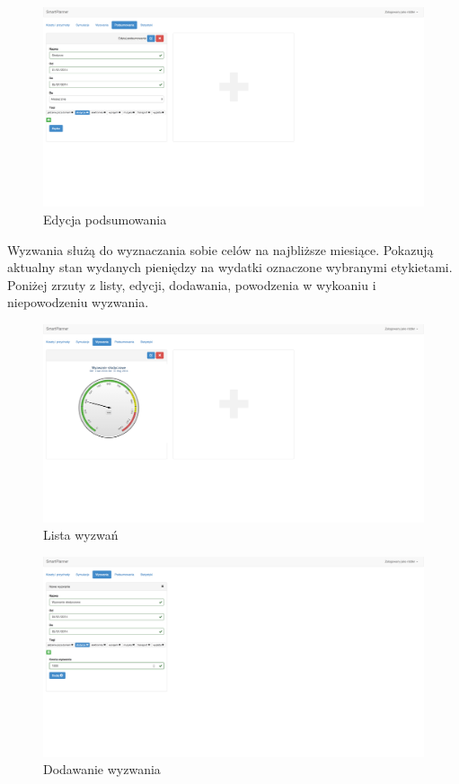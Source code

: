 \documentclass[10pt,titlepage]{article}
\begin{document}
\begin{figure}[H]
  \centering
  \includegraphics[scale=0.2]{images/screen_podsumowaniaEdycja.png}
  \caption{Edycja podsumowania}
  \label{screen:editSummary}
\end{figure}
\par Wyzwania służą do wyznaczania sobie celów na najbliższe miesiące. Pokazują aktualny stan wydanych pieniędzy na wydatki oznaczone wybranymi etykietami. Poniżej zrzuty z listy, edycji, dodawania, powodzenia w wykoaniu i niepowodzeniu wyzwania.
\begin{figure}[H]
  \centering
  \includegraphics[scale=0.2]{images/screen_wyzwania.png}
  \caption{Lista wyzwań}
\end{figure}
\begin{figure}[H]
  \centering
  \includegraphics[scale=0.2]{images/screen_wyzwaniaDodaj.png}
  \caption{Dodawanie wyzwania}
\end{figure}
\end{document}
